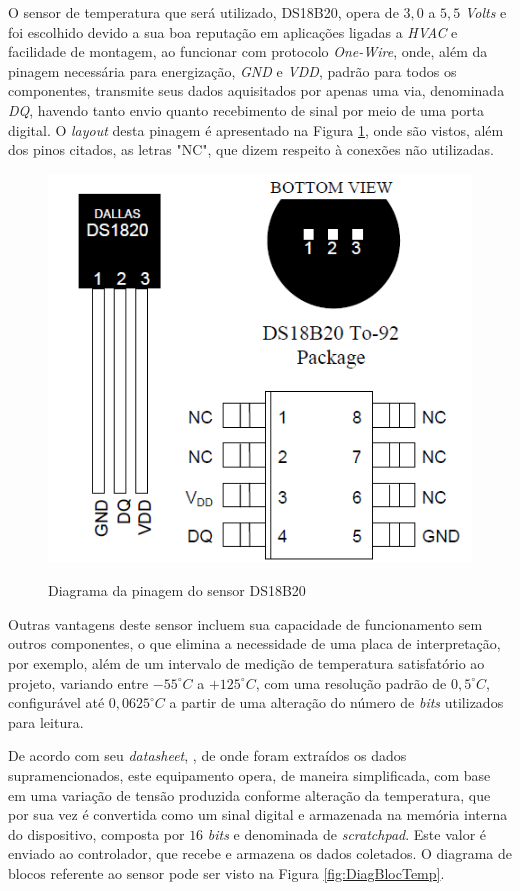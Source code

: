 \documentclass[acronym,symbols,table]{fei}
\begin{document}
O sensor de temperatura que será utilizado, DS18B20, opera de $3,0$ a $5,5$ \textit{Volts} e foi escolhido devido a sua boa reputação em aplicações ligadas a \textit{HVAC} e facilidade de montagem, ao funcionar com protocolo \textit{One-Wire}, onde, além da pinagem necessária para energização, \textit{GND} e \textit{VDD},  padrão para todos os componentes, transmite seus dados aquisitados por apenas uma via, denominada \textit{DQ}, havendo tanto envio quanto recebimento de sinal por meio de uma porta digital.  O \textit{layout} desta pinagem é apresentado na Figura \ref{fig:PinTemp}, onde são vistos, além dos pinos citados, as letras "NC", que dizem respeito à conexões não utilizadas.

\begin{figure}[!htb]
\centering
    \caption{Diagrama da pinagem do sensor DS18B20}
    \includegraphics[width=0.6\linewidth]{Imagens/PinTemp.png}
    \label{fig:PinTemp}
\end{figure}

Outras vantagens deste sensor incluem sua capacidade de funcionamento sem outros componentes, o que elimina a necessidade de uma placa de interpretação, por exemplo, além de um intervalo de medição de temperatura satisfatório ao projeto, variando entre ${-55}^{\circ}C$ a ${+125}^{\circ}C$, com uma resolução padrão de $0,5^{\circ}C$, configurável até $0,0625^{\circ}C$ a partir de uma alteração do número de \textit{bits} utilizados para leitura. 

De acordo com seu \textit{datasheet}, \textcite{DS18B20}, de onde foram extraídos os dados supramencionados, este equipamento opera, de maneira simplificada, com base em uma variação de tensão produzida conforme alteração da temperatura, que por sua vez é convertida como um sinal digital e armazenada na memória interna do dispositivo, composta por $16$ \textit{bits} e denominada de \textit{scratchpad}. Este valor é enviado ao controlador, que recebe e armazena os dados coletados. O diagrama de blocos referente ao sensor pode ser visto na Figura \ref{fig:DiagBlocTemp}. 
\end{document}
